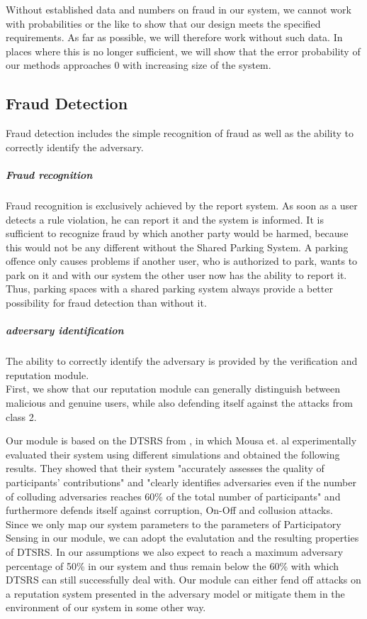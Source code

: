 \documentclass[
a4paper,     %
titlepage,   %
14pt         %
]{scrartcl}  %
\theoremstyle{mystyle}
\begin{document}
Without established data and numbers on fraud in our system, we cannot work with probabilities or the like to show that our design meets the specified requirements. As far as possible, we will therefore work without such data. In places where this is no longer sufficient, we will show that the error probability of our methods approaches 0 with increasing size of the system.

\subsection{Fraud Detection}
Fraud detection includes the simple recognition of fraud as well as the ability to correctly identify the adversary.  \\

\subparagraph{Fraud recognition} Fraud recognition is exclusively achieved by the report system. As soon as a user detects a rule violation, he can report it and the system is informed. It is sufficient to recognize fraud by which another party would be harmed, because this would not be any different without the Shared Parking System. A parking offence only causes problems if another user, who is authorized to park, wants to park on it and with our system the other user now has the ability to report it. Thus, parking spaces with a shared parking system always provide a better possibility for fraud detection than without it. \\

\subparagraph{adversary identification}The ability to correctly identify the adversary is provided by the verification and reputation module. \\

First, we show that our reputation module can generally distinguish between malicious and genuine users, while also defending itself against the attacks from class 2.

Our module is based on the DTSRS from \cite{mousa2017reputation}, in which Mousa et. al experimentally evaluated their system using different simulations and obtained the following results. They showed that their system "accurately assesses the quality of participants' contributions" and "clearly identifies adversaries even if the number of colluding adversaries reaches 60\% of the total number of participants" and furthermore defends itself against corruption, On-Off and collusion attacks. \\

Since we only map our system parameters to the parameters of Participatory Sensing in our module, we can adopt the evalutation and the resulting properties of DTSRS. In our assumptions we also expect to reach a maximum adversary percentage of 50\% in our system and thus remain below the 60\% with which DTSRS can still successfully deal with. Our module can either fend off attacks on a reputation system presented in the adversary model or mitigate them in the environment of our system in some other way.
\end{document}
